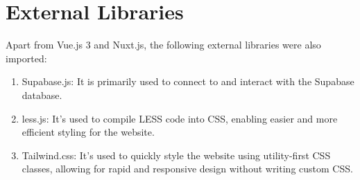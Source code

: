 \section{External Libraries}
Apart from Vue.js 3 and Nuxt.js, the following external libraries were also imported:
\begin{enumerate}
	\item Supabase.js: It is primarily used to connect to and interact with the Supabase database.
	\item less.js: It's used to compile LESS code into CSS, enabling easier and more efficient styling for the website.
	\item Tailwind.css: It's used to quickly style the website using utility-first CSS classes, allowing for rapid and responsive design without writing custom CSS.
\end{enumerate}